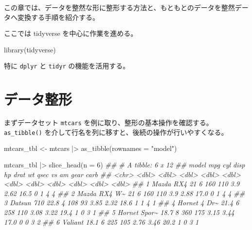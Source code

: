 \documentclass[
  letterpaper,
  xelatex,
  ja=standard, xelatex]{bxjsbook}
\newenvironment{Shaded}{\begin{snugshade}}{\end{snugshade}}
\newcommand{\AttributeTok}[1]{\textcolor[rgb]{0.40,0.45,0.13}{#1}}
\newcommand{\DecValTok}[1]{\textcolor[rgb]{0.68,0.00,0.00}{#1}}
\newcommand{\DocumentationTok}[1]{\textcolor[rgb]{0.37,0.37,0.37}{\textit{#1}}}
\newcommand{\FunctionTok}[1]{\textcolor[rgb]{0.28,0.35,0.67}{#1}}
\newcommand{\NormalTok}[1]{\textcolor[rgb]{0.00,0.23,0.31}{#1}}
\newcommand{\OtherTok}[1]{\textcolor[rgb]{0.00,0.23,0.31}{#1}}
\newcommand{\SpecialCharTok}[1]{\textcolor[rgb]{0.37,0.37,0.37}{#1}}
\newcommand{\StringTok}[1]{\textcolor[rgb]{0.13,0.47,0.30}{#1}}
\begin{document}
この章では、データを整然な形に整形する方法と、もともとのデータを整然データへ変換する手順を紹介する。

ここでは tidyverse を中心に作業を進める。

\begin{Shaded}
\begin{Highlighting}[]
\FunctionTok{library}\NormalTok{(tidyverse)}
\end{Highlighting}
\end{Shaded}

特に \texttt{dplyr} と \texttt{tidyr} の機能を活用する。

\section{データ整形}\label{ux30c7ux30fcux30bfux6574ux5f62}

まずデータセット \texttt{mtcars}
を例に取り、整形の基本操作を確認する。\texttt{as\_tibble()}
を介して行名を列に移すと、後続の操作が行いやすくなる。

\begin{Shaded}
\begin{Highlighting}[]
\NormalTok{mtcars\_tbl }\OtherTok{\textless{}{-}}\NormalTok{ mtcars }\SpecialCharTok{|\textgreater{}} 
  \FunctionTok{as\_tibble}\NormalTok{(}\AttributeTok{rownames =} \StringTok{"model"}\NormalTok{)}

\NormalTok{mtcars\_tbl }\SpecialCharTok{|\textgreater{}} \FunctionTok{slice\_head}\NormalTok{(}\AttributeTok{n =} \DecValTok{6}\NormalTok{)}
\DocumentationTok{\#\# \# A tibble: 6 x 12}
\DocumentationTok{\#\#   model          mpg   cyl  disp    hp  drat    wt  qsec    vs    am  gear  carb}
\DocumentationTok{\#\#   \textless{}chr\textgreater{}        \textless{}dbl\textgreater{} \textless{}dbl\textgreater{} \textless{}dbl\textgreater{} \textless{}dbl\textgreater{} \textless{}dbl\textgreater{} \textless{}dbl\textgreater{} \textless{}dbl\textgreater{} \textless{}dbl\textgreater{} \textless{}dbl\textgreater{} \textless{}dbl\textgreater{} \textless{}dbl\textgreater{}}
\DocumentationTok{\#\# 1 Mazda RX4     21       6   160   110  3.9   2.62  16.5     0     1     4     4}
\DocumentationTok{\#\# 2 Mazda RX4 W\textasciitilde{}  21       6   160   110  3.9   2.88  17.0     0     1     4     4}
\DocumentationTok{\#\# 3 Datsun 710    22.8     4   108    93  3.85  2.32  18.6     1     1     4     1}
\DocumentationTok{\#\# 4 Hornet 4 Dr\textasciitilde{}  21.4     6   258   110  3.08  3.22  19.4     1     0     3     1}
\DocumentationTok{\#\# 5 Hornet Spor\textasciitilde{}  18.7     8   360   175  3.15  3.44  17.0     0     0     3     2}
\DocumentationTok{\#\# 6 Valiant       18.1     6   225   105  2.76  3.46  20.2     1     0     3     1}
\end{Highlighting}
\end{Shaded}
\end{document}
